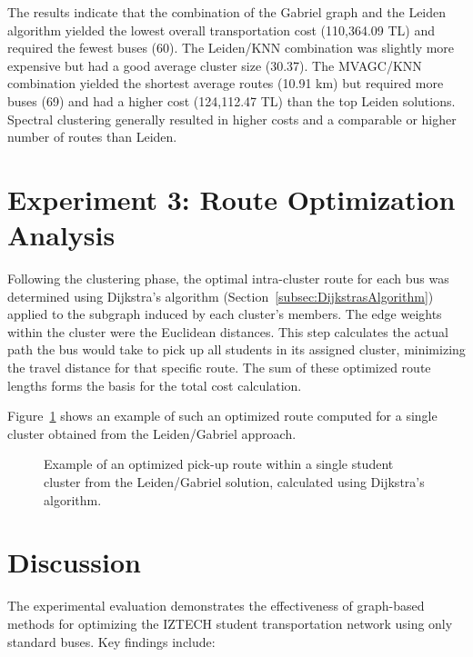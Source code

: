 The results indicate that the combination of the Gabriel graph and the Leiden algorithm yielded the lowest overall transportation cost (110,364.09 TL) and required the fewest buses (60). The Leiden/KNN combination was slightly more expensive but had a good average cluster size (30.37). The MVAGC/KNN combination yielded the shortest average routes (10.91 km) but required more buses (69) and had a higher cost (124,112.47 TL) than the top Leiden solutions. Spectral clustering generally resulted in higher costs and a comparable or higher number of routes than Leiden.

\section{Experiment 3: Route Optimization Analysis}
\label{sec:exp_route_opt}

Following the clustering phase, the optimal intra-cluster route for each bus was determined using Dijkstra's algorithm (Section~\ref{subsec:DijkstrasAlgorithm}) applied to the subgraph induced by each cluster's members. The edge weights within the cluster were the Euclidean distances. This step calculates the actual path the bus would take to pick up all students in its assigned cluster, minimizing the travel distance for that specific route. The sum of these optimized route lengths forms the basis for the total cost calculation.

Figure~\ref{fig:example_optimized_route} shows an example of such an optimized route computed for a single cluster obtained from the Leiden/Gabriel approach.

\begin{figure}[h]
    \centering
    \caption{Example of an optimized pick-up route within a single student cluster from the Leiden/Gabriel solution, calculated using Dijkstra's algorithm.}
    \label{fig:example_optimized_route}
\end{figure}

\section{Discussion}
\label{sec:discussion}

The experimental evaluation demonstrates the effectiveness of graph-based methods for optimizing the IZTECH student transportation network using only standard buses. Key findings include:

